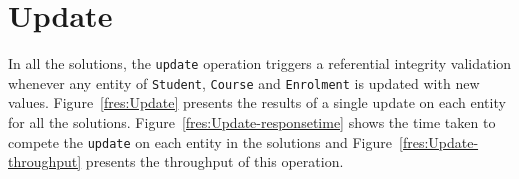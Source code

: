 
\section{Update} \label{s:results-update}
In all the solutions, the \texttt{update} operation triggers a referential
integrity validation whenever any entity of \texttt{Student}, \texttt{Course}
and \texttt{Enrolment} is updated with new values. Figure~\ref{fres:Update}
presents the results of a single update on each entity for all the solutions.
Figure~\ref{fres:Update-responsetime} shows the time taken to compete the
\texttt{update} on each entity in the solutions and
Figure~\ref{fres:Update-throughput} presents the throughput of this operation.

	\begin{figure}[H] 

\end{figure}
